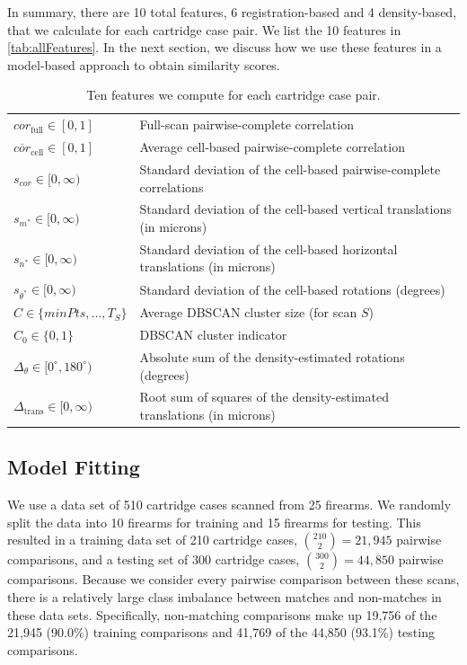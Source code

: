 \documentclass[reprint]{JASA}
\begin{document}
In summary, there are 10 total features, 6 registration-based and 4
density-based, that we calculate for each cartridge case pair. We list
the 10 features in \autoref{tab:allFeatures}. In the next section, we
discuss how we use these features in a model-based approach to obtain
similarity scores.

\begin{table}[htbp]
\centering
\begin{tabular}{p{.4\linewidth}p{.59\linewidth}}
$cor_{\text{full}} \in [0,1]$ & Full-scan pairwise-complete correlation \\
$\overline{cor}_{\text{cell}} \in [0,1]$ & Average cell-based pairwise-complete correlation \\
$s_{cor} \in [0,\infty)$ & Standard deviation of the cell-based pairwise-complete correlations \\
$s_{m^*} \in [0,\infty)$ & Standard deviation of the cell-based vertical translations (in microns) \\
$s_{n^*} \in [0,\infty)$ & Standard deviation of the cell-based horizontal translations (in microns) \\
$s_{\theta^*} \in [0,\infty)$ & Standard deviation of the cell-based rotations (degrees) \\
$C \in \{minPts,...,T_S\}$ & Average DBSCAN cluster size (for scan $S$)\\
$C_0 \in \{0,1\}$ & DBSCAN cluster indicator \\
$\Delta_\theta \in [0^\circ,180^\circ)$ & Absolute sum of the density-estimated rotations (degrees) \\
$\Delta_{\text{trans}} \in [0,\infty)$ & Root sum of squares of the density-estimated translations (in microns)
\end{tabular}
\caption{Ten features we compute for each cartridge case pair.}
\label{tab:allFeatures}
\end{table}

\hypertarget{model-fitting}{%
\subsection{Model Fitting}\label{model-fitting}}

We use a data set of 510 cartridge cases scanned from 25 firearms. We
randomly split the data into 10 firearms for training and 15 firearms
for testing. This resulted in a training data set of 210 cartridge
cases, \(\binom{210}{2} = 21,945\) pairwise comparisons, and a testing
set of 300 cartridge cases, \(\binom{300}{2} = 44,850\) pairwise
comparisons. Because we consider every pairwise comparison between these
scans, there is a relatively large class imbalance between matches and
non-matches in these data sets. Specifically, non-matching comparisons
make up 19,756 of the 21,945 (90.0\%) training comparisons and 41,769 of
the 44,850 (93.1\%) testing comparisons.
\end{document}

